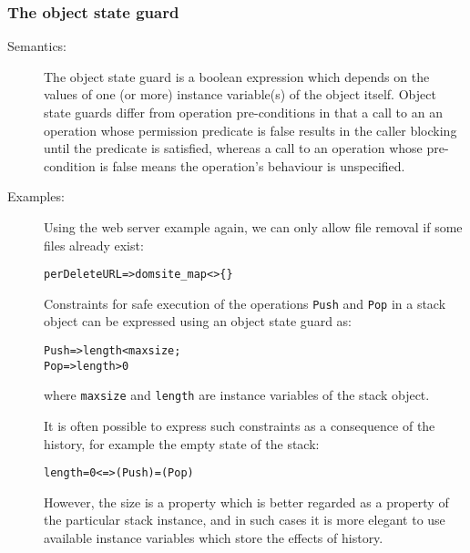 \documentclass[\pformat,12pt]{article}
\begin{document}
\subsubsection{The object state guard}
\begin{description}
\item[Semantics:] 
The object state guard is a boolean expression which depends on the values of
one (or more) instance variable(s) of the object itself. Object state
guards differ from operation pre-conditions in that a call to an an
operation whose permission predicate is false results in the caller
blocking until the predicate is satisfied, whereas a call to an
operation whose pre-condition is false means the operation's behaviour
is unspecified.

\item[Examples:] 
Using the web server example again, we can only allow file removal if
some files already exist:
\begin{alltt}
    per DeleteURL   => dom site_map <> \{\}
\end{alltt}

Constraints for safe execution of the operations {\tt Push} and {\tt Pop}
in a stack object can be expressed using an object state guard as:
\begin{alltt}
     Push => length < maxsize;\\
     Pop => length > 0
\end{alltt}
where {\tt maxsize} and {\tt length} are instance variables of
the stack object.

It is often possible to express such constraints as a
consequence of the history,
for example the empty state of the stack:
\begin{alltt}
    length = 0 <=> (Push) = (Pop)
\end{alltt}
However, the size is a property which is better regarded as a
property of the particular stack instance, and in such cases it is
more elegant to use available instance variables which store the effects
of history.

%
\end{description}
\end{document}
